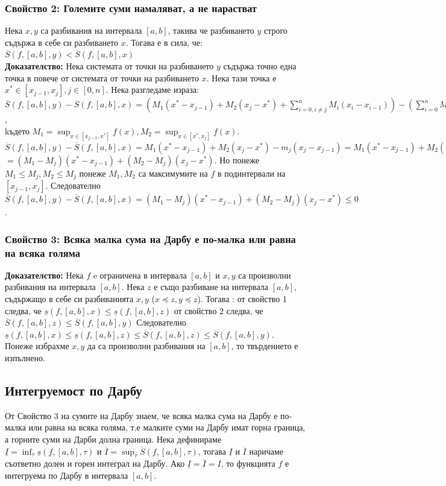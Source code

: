 \documentclass[fleqn,12pt]{article}
\begin{document}
\begin{flushleft}
\subsubsection{Свойство 2: Големите суми намаляват, а не нарастват}
Нека $x,y$ са разбивания на интервала $[a,b]$, такива че разбиването $y$ строго съдържа в себе си разбиването $x$. Тогава е в сила, че:
$\overline{S}(f,[a,b],y) < \overline{S}(f,[a,b],x)$\\
\textbf{Доказателство: } Нека системата от точки на разбиването $y$ съдържа точно една точка в повече от системата от точки на разбиването $x$.
Нека тази точка е $x^{*} \in [x_{j-1},x_j], j\in [0,n]$. Нека разгледаме израза:
$\overline{S}(f,[a,b],y) - \overline{S}(f,[a,b],x) = (M_1(x^{*} - x_{j-1}) + M_2(x_j - x^{*}) + \sum_{i=0,i \neq j}^{n} M_i(x_i - x_{i-1})) - (\sum_{i=0}^{n} M_i(x_i - x_{i-1}))$,\\ kъдето
$M_1 =\sup_{x\in[x_{j-1},x^{*}]}f(x), M_2 =\sup_{x\in[x^{*},x_j]}f(x)$.\\
$\overline{S}(f,[a,b],y) - \overline{S}(f,[a,b],x) = M_1(x^{*} - x_{j-1}) + M_2(x_j - x^{*}) - m_j(x_j - x_{j-1}) = M_1(x^{*} - x_{j-1}) + M_2(x_j - x^{*}) - M_j(x_j + x^{*} - x^{*} - x_{j-1})$
$ = (M_1-M_j)(x^{*} - x_{j-1}) + (M_2-M_j)(x_j - x^{*})$. Но понеже $M_1 \leq M_j, M_2 \leq M_j$ понеже $M_1,M_2$ са максимумите на $f$ в подинтервали на $[x_{j-1},x_j]$.
Следователно $\overline{S}(f,[a,b],y) - \overline{S}(f,[a,b],x) = (M_1-M_j)(x^{*} - x_{j-1}) + (M_2-M_j)(x_j - x^{*}) \leq 0$.

\subsubsection{Свойство 3: Всяка малка сума на Дарбу е по-малка или равна на всяка голяма}
\textbf{Доказателство: }
Нека $f$ e ограничена в интервала $[a,b]$ и $x,y$ са произволни разбивания на интервала $[a,b]$. Нека $z$ е също разбиване на интервала $[a,b]$,
съдържащо в себе си разбиванията $x,y$ ($x \preceq z, y \preceq z$). Тогава :
от свойство 1 следва, че $\underline{s}(f,[a,b],x) \leq \underline{s}(f,[a,b],z)$
от свойство 2 следва, че $\overline{S}(f,[a,b],z) \leq \overline{S}(f,[a,b],y)$
Следователно $\underline{s}(f,[a,b],x) \leq \underline{s}(f,[a,b],z) \leq \overline{S}(f,[a,b],z) \leq \overline{S}(f,[a,b],y)$.\\
Понеже избрахме $x,y$ да са произволни разбивания на $[a,b]$, то твърдението е изпълнено. 

\subsection{Интегруемост по Дарбу}
От Свойство 3 на сумите на Дарбу знаем, че всяка малка сума на Дарбу е по-малка или равна на всяка голяма, т.е малките суми на Дарбу имат горна граница, а горните суми на Дарби долна граница.
Нека дефинираме $\underline{I}=\inf_\tau \underline{s}(f,[a,b],\tau)$ и $\overline{I}=\sup_\tau \overline{S}(f,[a,b],\tau)$,
тогава $\underline{I}$ и  $\overline{I}$ наричаме съответно долен и горен интеграл на Дарбу. Ако $\underline{I}=\overline{I}=I$, то функцията $f$ е интегруема по Дарбу в интервала $[a,b]$.


\end{flushleft}
\end{document}

